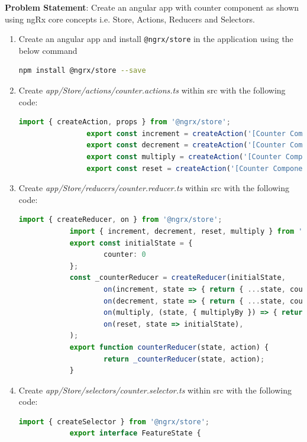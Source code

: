 \documentclass{report}
\begin{document}
\textbf{Problem Statement}: Create an angular app with counter component as shown using ngRx core concepts i.e. Store, Actions, Reducers and Selectors.

\begin{enumerate}
	\item{Create an angular app and install \lstinline{@ngrx/store} in the application using the below command}
		\begin{lstlisting}[language=bash]
			npm install @ngrx/store --save
	\end{lstlisting}
\item{Create \textit{app/Store/actions/counter.actions.ts} within src with the following code:}
			\begin{lstlisting}[language=Typescript,	caption=app/Store/actions/counter.actions.ts]
				import { createAction, props } from '@ngrx/store';
				export const increment = createAction('[Counter Component] Increment');
				export const decrement = createAction('[Counter Component] Decrement');
				export const multiply = createAction('[Counter Component] Multiply', props<{ multiplyBy: number }>());
				export const reset = createAction('[Counter Component] Reset');
\end{lstlisting}
\item{Create \textit{app/Store/reducers/counter.reducer.ts} within src with the following code:}
		\begin{lstlisting}[language=Typescript,	caption=app/Store/reducers/counter.reducer.ts]
			import { createReducer, on } from '@ngrx/store';
			import { increment, decrement, reset, multiply } from '../actions/counter.action';
			export const initialState = {
					counter: 0
			};
			const _counterReducer = createReducer(initialState,
					on(increment, state => { return { ...state, counter: state.counter + 1 } }),
					on(decrement, state => { return { ...state, counter: state.counter - 1 } }),
					on(multiply, (state, { multiplyBy }) => { return { ...state, counter: state.counter * multiplyBy } }),
					on(reset, state => initialState),
			);
			export function counterReducer(state, action) {
					return _counterReducer(state, action);
			}
\end{lstlisting}
\item{Create \textit{app/Store/selectors/counter.selector.ts} within src with the following code:}
		\begin{lstlisting}[language=Typescript, caption=app/Store/selectors/counter.selector.ts]
			import { createSelector } from '@ngrx/store';
			export interface FeatureState {

\end{lstlisting}
\end{enumerate}
\end{document}
